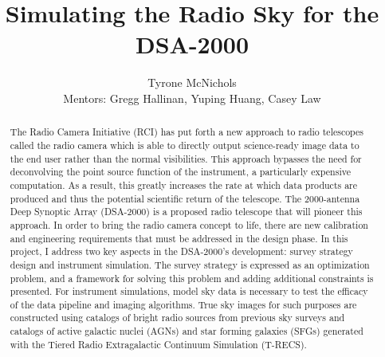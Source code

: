 \documentclass{article}
\title{Simulating the Radio Sky for the DSA-2000}
\author{Tyrone McNichols \\Mentors: Gregg Hallinan, Yuping Huang, Casey Law}
\date{}
\begin{document}
\maketitle

\begin{abstract}
    The Radio Camera Initiative (RCI) has put forth a new approach to radio telescopes called the radio camera which is able to directly output science-ready image data to the end user rather than the normal visibilities. This approach bypasses the need for deconvolving the point source function of the instrument, a particularly expensive computation. As a result, this greatly increases the rate at which data products are produced and thus the potential scientific return of the telescope. The 2000-antenna Deep Synoptic Array (DSA-2000) is a proposed radio telescope that will pioneer this approach. In order to bring the radio camera concept to life, there are new calibration and engineering requirements that must be addressed in the design phase. In this project, I address two key aspects in the DSA-2000's development: survey strategy design and instrument simulation. The survey strategy is expressed as an optimization problem, and a framework for solving this problem and adding additional constraints is presented. For instrument simulations, model sky data is necessary to test the efficacy of the data pipeline and imaging algorithms. True sky images for such purposes are constructed using catalogs of bright radio sources from previous sky surveys and catalogs of active galactic nuclei (AGNs) and star forming galaxies (SFGs) generated with the Tiered Radio Extragalactic Continuum Simulation (T-RECS).
\end{abstract}
\end{document}
